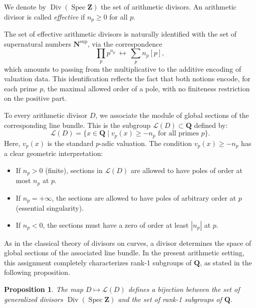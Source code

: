 \documentclass[11pt,a4paper]{article}
\newcommand{\Q}{\mathbf{Q}}
\newcommand{\Z}{\mathbf{Z}}
\newcommand{\N}{\mathbf{N}}
\def\N{{\mathbf N}}
\def\spz{\Spec \Z}
\newcommand{\Spec}{\operatorname{Spec}}
\def\spz{\Spec \Z}
\theoremstyle{plain}
\newtheorem{prop}[thm]{Proposition}
\theoremstyle{definition} %
\begin{document}
We denote by $\operatorname{Div}(\spz)$ the set of arithmetic divisors. An arithmetic divisor is called \emph{effective} if $n_p \ge 0$ for all $p$. \vspace{.03in}


The set of effective arithmetic divisors is naturally identified with the set of
supernatural numbers $\N^{\sup}$, via the correspondence
\[
\prod_p p^{n_p}\ \longleftrightarrow\ \sum_p n_p [p],
\]
which amounts to passing from the multiplicative to the additive encoding of
valuation data. This identification reflects the fact that both notions encode, for each prime $p$,
the maximal allowed order of a pole, with no finiteness restriction on the positive
part.\vspace{.03in}







To every arithmetic divisor $D$, we associate the module of global sections of the corresponding line bundle. This is the subgroup $\mathcal L(D) \subset \Q$ defined by:
\[
\mathcal L(D) = \{ x \in \Q \mid v_p(x) \ge -n_p \text{ for all primes } p \}.
\]
Here, $v_p(x)$ is the standard $p$-adic valuation. The condition $v_p(x) \ge -n_p$ has a clear geometric interpretation:
\begin{itemize}[leftmargin=*, labelindent=0pt]
    \item[] If $n_p > 0$ (finite), sections in $\mathcal L(D)$ are allowed to have poles of order at most $n_p$ at $p$.
    \item[] If $n_p = +\infty$, the sections are allowed to have poles of arbitrary order at $p$ (essential singularity).
    \item[] If $n_p < 0$, the sections must have a zero of order at least $|n_p|$ at $p$.
\end{itemize}

As in the classical theory of divisors on curves, a divisor determines the space of
global sections of the associated line bundle.
In the present arithmetic setting, this assignment completely characterizes
rank-1 subgroups of $\Q$, as stated in the following proposition.

\begin{prop}\label{rankpro}
The map $D \mapsto \mathcal L(D)$ defines a bijection between the set of generalized divisors $\operatorname{Div}(\spz)$ and the set of rank-1 subgroups of $\Q$.
\end{prop}
\end{document}
